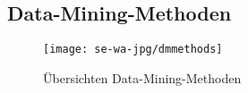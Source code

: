 \subsection{Data-Mining-Methoden}
\label{dmmethoden}

\begin{figure}[H]
\centering
\texttt{[image: se-wa-jpg/dmmethods]}
\caption[Übersichten Data-Mining-Methoden]{Übersichten Data-Mining-Methoden\protect\footnotemark}
\label{dmmethods}
\end{figure}

